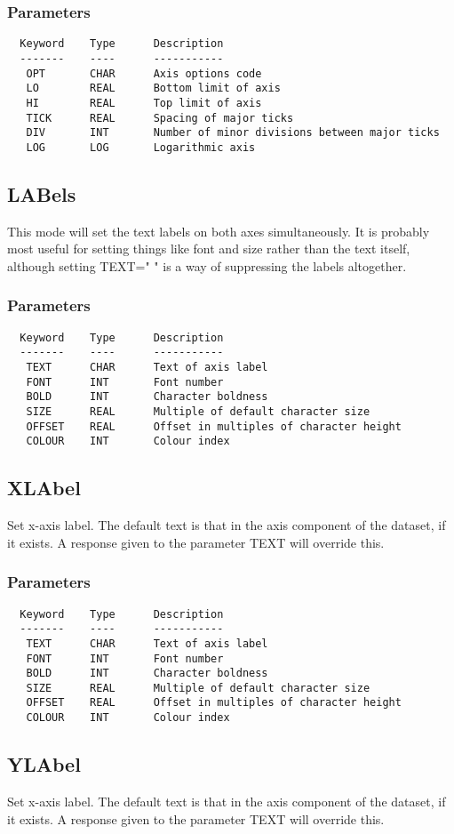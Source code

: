 \documentclass{book}
\renewcommand{\_}{{\tt\char'137}}     %
\begin{document}
\subsubsection{Parameters}
\begin{verbatim}
  Keyword    Type      Description
  -------    ----      -----------
   OPT       CHAR      Axis options code
   LO        REAL      Bottom limit of axis
   HI        REAL      Top limit of axis
   TICK      REAL      Spacing of major ticks
   DIV       INT       Number of minor divisions between major ticks
   LOG       LOG       Logarithmic axis
\end{verbatim}\subsection{LABels}
This mode will set the text labels on both axes simultaneously.
It is probably most useful for setting things like font and size
rather than the text itself, although setting TEXT=" " is a way
of suppressing the labels altogether.
 
\subsubsection{Parameters}
\begin{verbatim}
  Keyword    Type      Description
  -------    ----      -----------
   TEXT      CHAR      Text of axis label
   FONT      INT       Font number
   BOLD      INT       Character boldness
   SIZE      REAL      Multiple of default character size
   OFFSET    REAL      Offset in multiples of character height
   COLOUR    INT       Colour index
\end{verbatim}\subsection{XLAbel}
Set x-axis label. The default text is that in the axis component
of the dataset, if it exists. A response given to the parameter
TEXT will override this.
 
\subsubsection{Parameters}
\begin{verbatim}
  Keyword    Type      Description
  -------    ----      -----------
   TEXT      CHAR      Text of axis label
   FONT      INT       Font number
   BOLD      INT       Character boldness
   SIZE      REAL      Multiple of default character size
   OFFSET    REAL      Offset in multiples of character height
   COLOUR    INT       Colour index
\end{verbatim}\subsection{YLAbel}
Set x-axis label. The default text is that in the axis component
of the dataset, if it exists. A response given to the parameter
TEXT will override this.
 
\end{document}
